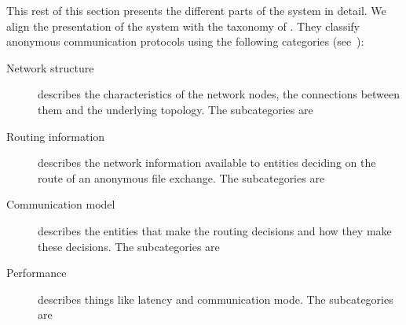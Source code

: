 This rest of this section presents the different parts of the system in detail.
We align the presentation of the system with the taxonomy of 
\textcite{RoutingSurveyAnonymousProtocols}.
They classify anonymous communication protocols using the following 
categories (see~\cite[Table 1]{RoutingSurveyAnonymousProtocols}):
\begin{description}
  \item[Network structure]
    describes the characteristics of the network nodes, the connections between 
    them and the underlying topology.
    The subcategories are

  \item[Routing information]
    describes the network information available to entities deciding on 
    the route of an anonymous file exchange.
    The subcategories are

  \item[Communication model]
    describes the entities that make the routing decisions and how they 
    make these decisions.
    The subcategories are

  \item[Performance]
    describes things like latency and communication mode.
    The subcategories are
\end{description}

